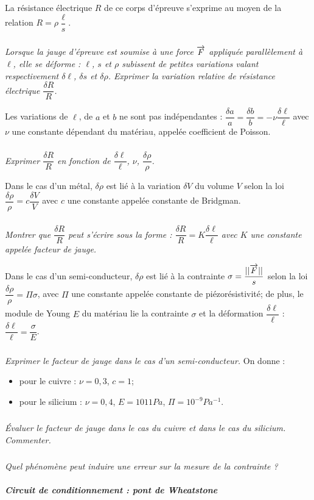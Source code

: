 \documentclass[10pt,fleqn]{article} %
\begin{document}
La résistance électrique $R$ de ce corps d'épreuve s'exprime au moyen de la relation $R = \rho \dfrac{\ell}{s}$.


\subparagraph{}
\textit{Lorsque la jauge d'épreuve est soumise à une force $\overrightarrow{F}$ appliquée parallèlement à $\ell$, elle se
déforme : $\ell$, $s$ et $\rho$ subissent de petites variations valant respectivement $\delta \ell$, $\delta s$ et $\delta \rho$. Exprimer
la variation relative de résistance électrique $\dfrac{\delta R}{R}$.}

Les variations de $\ell$, de $a$ et $b$ ne sont pas indépendantes : $\dfrac{\delta a}{a}=\dfrac{\delta b}{b}=-\nu \dfrac{\delta \ell}{\ell}$ avec $\nu$ une constante dépendant du matériau, appelée coefficient de Poisson.

\subparagraph{}
\textit{Exprimer $\dfrac{\delta R}{R}$ en fonction de $\dfrac{\delta \ell}{\ell}$, $\nu$, $\dfrac{\delta \rho}{\rho}$.}



Dans le cas d'un métal, $\delta \rho$ est lié à la variation $\delta V$ du volume $V$ selon la loi $\dfrac{\delta \rho}{\rho}=c \dfrac{\delta V}{V}$ avec $c$ une constante appelée constante de Bridgman.

\subparagraph{}
\textit{Montrer que $\dfrac{\delta R}{R}$  peut s'écrire sous la forme : $\dfrac{\delta R}{R}=K\dfrac{\delta \ell }{\ell}$
avec $K$ une constante appelée facteur de jauge.}

Dans le cas d'un semi-conducteur, $\delta \rho$ est lié à la contrainte $\sigma = \dfrac{||\overrightarrow{F}||}{s}$
selon la loi $\dfrac{\delta \rho}{\rho}=\Pi \sigma$, avec $\Pi$ une constante appelée constante de piézorésistivité; de plus, le module de
 Young $E$ du matériau lie la contrainte $\sigma$ et la déformation $\dfrac{\delta \ell}{\ell}$ : $\dfrac{\delta \ell}{\ell} = \dfrac{\sigma}{E}$.


\subparagraph{}
\textit{Exprimer le facteur de jauge dans le cas d'un semi-conducteur.}
On donne : 
\begin{itemize}
\item pour le cuivre : $\nu =0,3$, $c = 1$;
\item pour le silicium : $\nu =0,4$, $E = 1011 Pa$, $\Pi= 10^{-9}Pa^{-1}$.
\end{itemize}

\subparagraph{}
\textit{Évaluer le facteur de jauge dans le cas du cuivre et dans le cas du silicium. Commenter.}
\subparagraph{}
\textit{Quel phénomène peut induire une erreur sur la mesure de la contrainte ?}

\subparagraph{Circuit de conditionnement : pont de Wheatstone}
\end{document}
